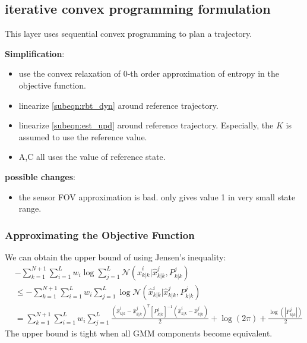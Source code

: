 \documentclass[letterpaper, 10 pt, conference]{ieeeconf}  %
\begin{document}
\subsection{iterative convex programming formulation}
This layer uses sequential convex programming to plan a trajectory. 

\textbf{Simplification}:
\begin{itemize}
	\item use the convex relaxation of $0$-th order approximation of entropy in the objective function.
	\item linearize \cref{subeqn:rbt_dyn} around reference trajectory.
	\item linearize \cref{subeqn:est_upd} around reference trajectory.  Especially, the $K$ is assumed to use the reference value.
	\item A,C all uses the value of reference state.
\end{itemize}

\textbf{possible changes}:
\begin{itemize}
	\item the sensor FOV approximation is bad. only gives value 1 in very small state range.
\end{itemize}

\subsubsection{Approximating the Objective Function}
We can obtain the upper bound of  using Jensen's inequality:
\begin{align*}
&-\sum\limits_{k=1}^{N+1} \sum\limits_{i=1}^{L}w_i\log \sum\limits_{j=1}^L\mathcal{N}(\hat{x}^i_{k|k}|\hat{x}^j_{k|k},P^j_{k|k})\\
&\leq -\sum\limits_{k=1}^{N+1} \sum\limits_{i=1}^{L}w_i \sum\limits_{j=1}^L\log\mathcal{N}(\hat{x}^i_{k|k}|\hat{x}^j_{k|k},P^j_{k|k})\\
&=\sum\limits_{k=1}^{N+1} \sum\limits_{i=1}^{L}w_i \sum\limits_{j=1}^L\frac{(\hat{x}^i_{k|k}-\hat{x}^j_{k|k})^T[P^j_{k|k}]^{-1}(\hat{x}^i_{k|k}-\hat{x}^j_{k|k})}{2}+\log(2\pi)+\frac{\log(|P^j_{k|k}|)}{2}
\end{align*}
The upper bound is tight when all GMM components become equivalent.
\end{document}
